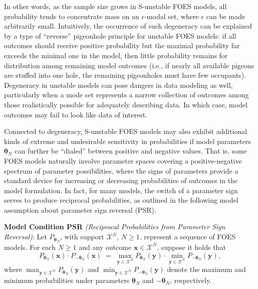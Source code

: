 \documentclass[numbib]{imamat}
\theoremstyle{theorem}
\theoremstyle{lemma}
\theoremstyle{example}
\theoremstyle{corollary}
\theoremstyle{definition}
\theoremstyle{remark}
\theoremstyle{approximation}
\theoremstyle{scheme}
\begin{document}
In other words, as the sample size grows in S-unstable FOES models, all probability tends to concentrate mass on an \(\epsilon\)-modal set, where \(\epsilon\) can be made arbitrarily small. Intuitively, the occurrence of such degeneracy can be explained by a type of ``reverse'' pigeonhole principle for unstable FOES models: if all outcomes should receive positive probability but the maximal probability far exceeds the minimal one in the model, then little probability remains for distribution among remaining model outcomes (i.e., if nearly all available pigeons are stuffed into one hole, the remaining pigeonholes must have few occupants). Degeneracy in unstable models can pose dangers in data modeling as well, particularly when a mode set represents a narrow collection of outcomes among those realistically possible for adequately describing data. In which case, model outcomes may fail to look like data of interest.

Connected to degeneracy, S-unstable FOES models may also exhibit additional kinds of extreme and undesirable sensitivity in probabilities if model parameters \(\boldsymbol \theta_N\) can further be ``dialed'' between positive and negative values. That is, some FOES models naturally involve parameter spaces covering a positive-negative spectrum of parameter possibilities, where the signs of parameters provide a standard device for increasing or decreasing probabilities of outcomes in the model formulation. In fact, for many models, the switch of a parameter sign serves to produce reciprocal probabilities, as outlined in the following model assumption about parameter sign reversal (PSR).

\textbf{Model Condition PSR} \emph{(Reciprocal Probabilities from Parameter Sign Reversal)}: Let \(P_{\boldsymbol \theta_N}\), with support \(\mathcal{X}^N\), \(N\geq 1\), represent a sequence of FOES models. For each \(N \geq 1\) and any outcome \(\boldsymbol x \in \mathcal{X}^N\), suppose it holds that
\[
P_{\boldsymbol \theta_N}(\boldsymbol x)  \cdot P_{-\boldsymbol \theta_N}(\boldsymbol x) \;=\;   \max\limits_{\boldsymbol y \in \mathcal{X}^N}P_{ \boldsymbol \theta_N}(\boldsymbol y)\cdot \min\limits_{\boldsymbol y \in \mathcal{X}^N}P_{-\boldsymbol \theta_N}(\boldsymbol y),
\]
where \(\max_{\boldsymbol y \in \mathcal{X}^N}P_{ \boldsymbol \theta_N}(\boldsymbol y)\) and \(\min_{\boldsymbol y \in \mathcal{X}^N}P_{-\boldsymbol \theta_N}(\boldsymbol y)\) denote the maximum and minimum probabilities under parameters \(\boldsymbol \theta_N\) and \(-\boldsymbol \theta_N\), respectively.
\end{document}
